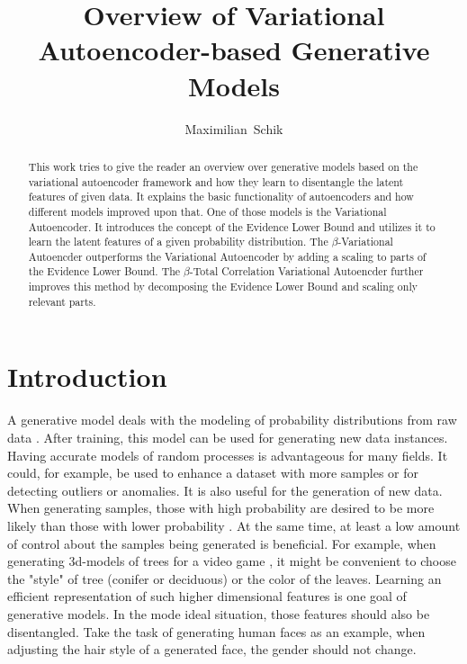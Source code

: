 \documentclass[a4paper]{IEEEtran}
\title{Overview of Variational Autoencoder-based Generative Models}
\author{Maximilian~Schik}
\begin{document}
\maketitle

\begin{abstract}
This work tries to give the reader an overview over generative models based on the variational autoencoder framework and how they learn to disentangle the latent features of given data. It explains the basic functionality of autoencoders and how different models improved upon that. One of those models is the Variational Autoencoder. It introduces the concept of the Evidence Lower Bound and utilizes it to learn the latent features of a given probability distribution. The $\beta$-Variational Autoencder outperforms the Variational Autoencoder by adding a scaling to parts of the Evidence Lower Bound. The $\beta$-Total Correlation Variational Autoencder further improves this method by decomposing the Evidence Lower Bound and scaling only relevant parts.
\end{abstract}

\section{Introduction}
A generative model deals with the modeling of probability distributions from raw data \cite{doersch2016tutorial}. After training, this model can be used for generating new data instances. Having accurate models of random processes is advantageous for many fields. It could, for example, be used to enhance a dataset with more samples or for detecting outliers or anomalies. It is also useful for the generation of new data. When generating samples, those with high probability are desired to be more likely than those with lower probability \cite{doersch2016tutorial}. At the same time, at least a low amount of control about the samples being generated is beneficial. For example, when generating 3d-models of trees for a video game \cite{doersch2016tutorial}, it might be convenient to choose the "style" of tree (conifer or deciduous) or the color of the leaves. Learning an efficient representation of such higher dimensional features is one goal of generative models. In the mode ideal situation, those features should also be disentangled. Take the task of generating human faces as an example, when adjusting the hair style of a generated face, the gender should not change.
\end{document}
